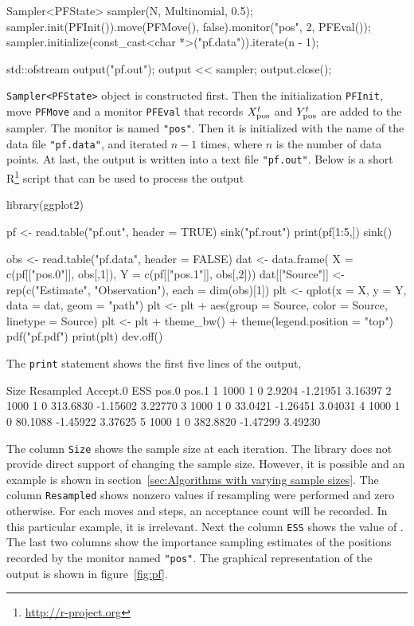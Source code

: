 \begin{cppcode}
    Sampler<PFState> sampler(N, Multinomial, 0.5);
    sampler.init(PFInit()).move(PFMove(), false).monitor("pos", 2, PFEval());
    sampler.initialize(const_cast<char *>("pf.data")).iterate(n - 1);

    std::ofstream output("pf.out");
    output << sampler;
    output.close();
\end{cppcode}
\verb|Sampler<PFState>| object is constructed first. Then the initialization
\verb|PFInit|, move \verb|PFMove| and a monitor \verb|PFEval| that records
$X_{\mathrm{pos}}^t$ and $Y_{\mathrm{pos}}^t$ are added to the sampler. The monitor is named
\verb|"pos"|. Then it is initialized with the name of the data file
\verb|"pf.data"|, and iterated $n - 1$ times, where $n$ is the number of data
points. At last, the output is written into a text file \verb|"pf.out"|. Below
is a short R\footnote{\url{http://r-project.org}} script that can be used to
process the output
\begin{rcode}
  library(ggplot2)

  pf <- read.table("pf.out", header = TRUE)
  sink("pf.rout")
  print(pf[1:5,])
  sink()

  obs <- read.table("pf.data", header = FALSE)
  dat <- data.frame(
  X = c(pf[["pos.0"]], obs[,1]),
  Y = c(pf[["pos.1"]], obs[,2]))
  dat[["Source"]] <- rep(c("Estimate", "Observation"), each = dim(obs)[1])
  plt <- qplot(x = X, y = Y, data = dat, geom = "path")
  plt <- plt + aes(group = Source, color = Source, linetype = Source)
  plt <- plt + theme_bw() + theme(legend.position = "top")
  pdf("pf.pdf")
  print(plt)
  dev.off()
\end{rcode}
The \verb|print| statement shows the first five lines of the output,
\begin{textcode}
    Size Resampled Accept.0      ESS    pos.0   pos.1
  1 1000         1        0   2.9204 -1.21951 3.16397
  2 1000         1        0 313.6830 -1.15602 3.22770
  3 1000         1        0  33.0421 -1.26451 3.04031
  4 1000         1        0  80.1088 -1.45922 3.37625
  5 1000         1        0 382.8820 -1.47299 3.49230
\end{textcode}
The column \verb|Size| shows the sample size at each iteration. The library
does not provide direct support of changing the sample size. However, it is
possible and an example is shown in section~\ref{sec:Algorithms with varying
  sample sizes}. The column \verb|Resampled| shows nonzero values if resampling
were performed and zero otherwise. For each moves and \mcmc steps, an
acceptance count will be recorded. In this particular example, it is
irrelevant. Next the column \verb|ESS| shows the value of \ess. The last two
columns show the importance sampling estimates of the positions recorded by the
monitor named \verb|"pos"|.  The graphical representation of the output is
shown in figure~\ref{fig:pf}.

